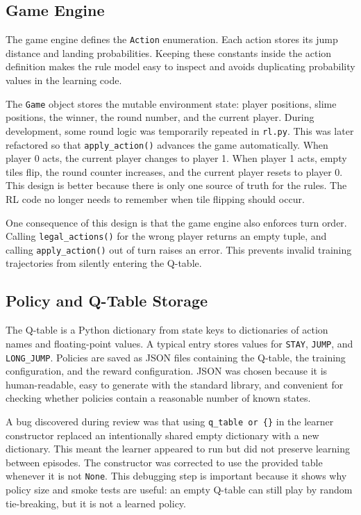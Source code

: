 \documentclass[conference]{IEEEtran}
\begin{document}
\subsection{Game Engine}

The game engine defines the \texttt{Action} enumeration. Each action stores its jump
distance and landing probabilities. Keeping these constants inside the action
definition makes the rule model easy to inspect and avoids duplicating probability
values in the learning code.

The \texttt{Game} object stores the mutable environment state: player positions,
slime positions, the winner, the round number, and the current player. During
development, some round logic was temporarily repeated in \texttt{rl.py}. This was
later refactored so that \texttt{apply\_action()} advances the game automatically.
When player 0 acts, the current player changes to player 1. When player 1 acts,
empty tiles flip, the round counter increases, and the current player resets to
player 0. This design is better because there is only one source of truth for the
rules. The RL code no longer needs to remember when tile flipping should occur.

One consequence of this design is that the game engine also enforces turn order.
Calling \texttt{legal\_actions()} for the wrong player returns an empty tuple, and
calling \texttt{apply\_action()} out of turn raises an error. This prevents invalid
training trajectories from silently entering the Q-table.

\subsection{Policy and Q-Table Storage}

The Q-table is a Python dictionary from state keys to dictionaries of action names
and floating-point values. A typical entry stores values for \texttt{STAY},
\texttt{JUMP}, and \texttt{LONG\_JUMP}. Policies are saved as JSON files containing
the Q-table, the training configuration, and the reward configuration. JSON was
chosen because it is human-readable, easy to generate with the standard library,
and convenient for checking whether policies contain a reasonable number of known
states.

A bug discovered during review was that using \texttt{q\_table or \{\}} in the
learner constructor replaced an intentionally shared empty dictionary with a new
dictionary. This meant the learner appeared to run but did not preserve learning
between episodes. The constructor was corrected to use the provided table whenever
it is not \texttt{None}. This debugging step is important because it shows why
policy size and smoke tests are useful: an empty Q-table can still play by random
tie-breaking, but it is not a learned policy.
\end{document}
